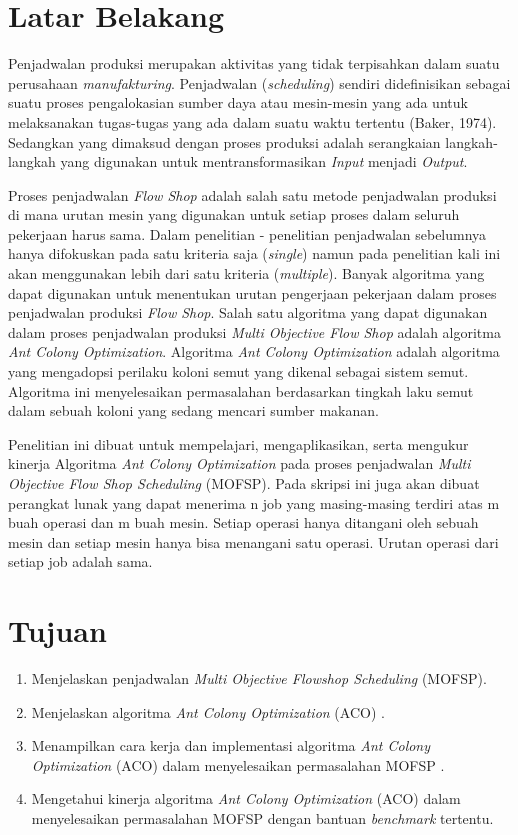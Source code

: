 \documentclass[a4paper,twoside]{article}
\begin{document}
\section{Latar Belakang}

Penjadwalan produksi merupakan aktivitas yang tidak terpisahkan dalam suatu perusahaan {\it manufakturing}. Penjadwalan ({\it scheduling}) sendiri didefinisikan sebagai suatu proses pengalokasian sumber daya atau mesin-mesin yang ada untuk melaksanakan tugas-tugas yang ada dalam suatu waktu tertentu (Baker, 1974). Sedangkan yang dimaksud dengan proses produksi adalah serangkaian langkah-langkah yang digunakan untuk mentransformasikan {\it Input} menjadi {\it Output}.

Proses penjadwalan {\it Flow Shop} adalah salah satu metode penjadwalan produksi di mana urutan mesin yang digunakan untuk setiap proses dalam seluruh pekerjaan harus sama. Dalam penelitian - penelitian penjadwalan sebelumnya hanya difokuskan pada satu kriteria saja ({\it single}) namun pada penelitian kali ini akan menggunakan lebih dari satu kriteria ({\it multiple}). Banyak algoritma yang dapat digunakan untuk menentukan urutan  pengerjaan pekerjaan dalam proses penjadwalan produksi {\it Flow Shop}. Salah satu algoritma yang dapat digunakan dalam proses penjadwalan produksi {\it Multi Objective Flow Shop} adalah algoritma {\it Ant Colony Optimization}. Algoritma {\it Ant Colony Optimization} adalah algoritma yang mengadopsi perilaku koloni semut yang dikenal sebagai sistem semut. Algoritma ini menyelesaikan permasalahan berdasarkan tingkah laku semut dalam sebuah koloni yang sedang mencari sumber makanan.

Penelitian ini dibuat untuk mempelajari, mengaplikasikan, serta mengukur kinerja Algoritma {\it Ant Colony Optimization} pada proses penjadwalan {\it Multi Objective Flow Shop Scheduling} (MOFSP). Pada skripsi ini juga akan dibuat perangkat lunak yang dapat menerima n job yang masing-masing terdiri atas m buah operasi dan m buah mesin. Setiap operasi hanya ditangani oleh sebuah mesin dan setiap mesin hanya bisa menangani satu operasi. Urutan operasi dari setiap job adalah sama.

\section{Tujuan}

\begin{enumerate}[label=(\alph*)]
	\item Menjelaskan penjadwalan {\it Multi Objective Flowshop Scheduling} (MOFSP).
	\item Menjelaskan algoritma {\it Ant Colony Optimization} (ACO) .
	\item Menampilkan  cara kerja dan implementasi algoritma {\it Ant Colony Optimization} (ACO) dalam menyelesaikan permasalahan MOFSP .
	\item Mengetahui kinerja algoritma {\it Ant Colony Optimization} (ACO) dalam menyelesaikan permasalahan MOFSP dengan bantuan {\it benchmark} tertentu.
\end{enumerate}
\end{document}
